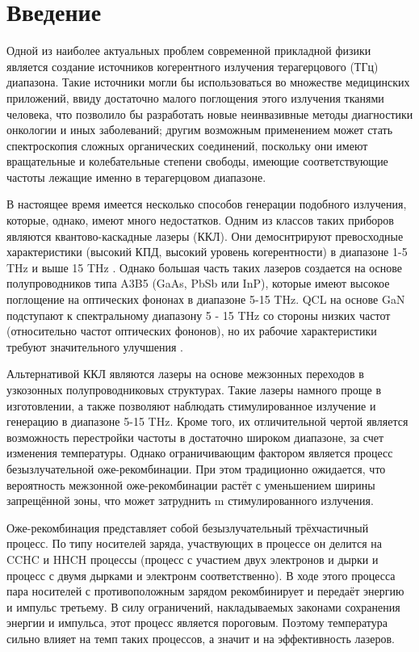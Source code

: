 \documentclass[../main.tex]{subfiles}
\begin{document}
\chapter{Введение}

Одной из наиболее актуальных проблем современной прикладной физики является
создание источников когерентного излучения терагерцового (ТГц) диапазона. Такие
источники могли бы использоваться во множестве медицинских приложений, ввиду достаточно 
малого поглощения этого излучения тканями человека, что позволило бы разработать 
новые неинвазивные методы диагностики онкологии и иных заболеваний; другим возможным 
применением может стать спектроскопия сложных органических соединений, поскольку 
они имеют вращательные и колебательные степени свободы, имеющие соответствующие частоты 
лежащие именно в терагерцовом диапазоне.

В настоящее время имеется несколько способов генерации подобного излучения, которые, однако, 
имеют много недостатков. Одним из классов таких приборов являются квантово-каскадные лазеры (ККЛ).
Они демоснтрируют превосходные характеристики (высокий КПД, высокий уровень когерентности)
в диапазоне 1-5 THz и выше 15 THz \cite{Intro1}. Однако большая часть таких лазеров создается на основе 
полупроводников типа A3B5 (GaAs, PbSb или InP), которые имеют высокое поглощение на оптических 
фононах в диапазоне 5-15 THz. QCL на основе GaN подступают к спектральному диапазону 5 - 15 THz со
стороны низких частот (относительно частот оптических фононов), но их рабочие характеристики 
требуют значительного улучшения \cite{Intro7}.

Альтернативой ККЛ являются лазеры на основе межзонных переходов в узкозонных полупроводниковых структурах.
Такие лазеры намного проще в изготовлении, а также позволяют наблюдать стимулированное излучение и генерацию
в диапазоне 5-15 THz. Кроме того, их 
отличительной чертой является возможность перестройки частоты в достаточно широком диапазоне, за счет 
изменения температуры. Однако ограничивающим
фактором является процесс безызлучательной оже-рекомбинации. При этом традиционно ожидается, что вероятность 
межзонной оже-рекомбинации растёт с уменьшением ширины запрещённой зоны, что может затруднить m
стимулированного излучения.

Оже-рекомбинация представляет собой безызлучательный трёхчастичный процесс. По типу носителей заряда, участвующих
в процессе он делится на CCHC и HHCH процессы (процесс с участием двух электронов и дырки и процесс с двумя дырками
и электронм соответственно). В ходе этого процесса пара носителей с противоположным зарядом рекомбинирует и
передаёт энергию и импульс третьему. В силу ограничений, накладываемых законами сохранения энергии и импульса,
 этот процесс является пороговым.
Поэтому температура сильно влияет на темп таких процессов, а значит и на эффективность лазеров.
\end{document}

